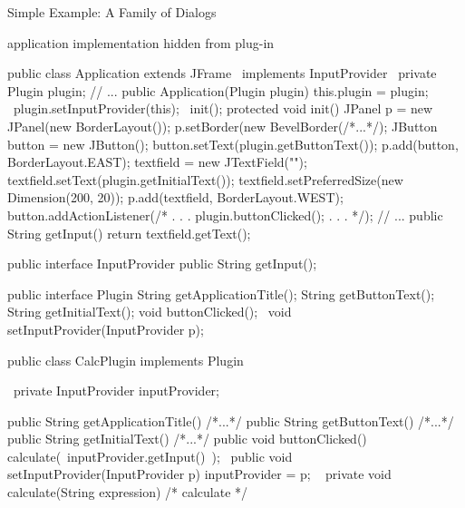 \begin{frame}[fragile]{Simple Example: A Family of Dialogs}
	\begin{fancycolumns}
		\begin{note}{}
			application implementation hidden from plug-in
		\end{note}
\begin{codetight}[basicstyle=\tiny]{}
public class Application extends JFrame ~implements InputProvider~ {
	private Plugin plugin;
	// ...
	public Application(Plugin plugin) {
		this.plugin = plugin;
		~plugin.setInputProvider(this);~
		init();
	}
	protected void init() {
		JPanel p = new JPanel(new BorderLayout());
		p.setBorder(new BevelBorder(/*...*/);
		JButton button = new JButton();
		button.setText(plugin.getButtonText());
		p.add(button, BorderLayout.EAST);
		textfield = new JTextField("");
		textfield.setText(plugin.getInitialText());
		textfield.setPreferredSize(new Dimension(200, 20));
		p.add(textfield, BorderLayout.WEST);		
		button.addActionListener(/* . . . plugin.buttonClicked(); . . . */);		
		// ...
	}
	public String getInput() {
		return textfield.getText();
	}
}
\end{codetight}
		\nextcolumn
{
\begin{codetight}[basicstyle=\tiny]{}
public interface InputProvider {
	public String getInput();
}
\end{codetight}
\begin{codetight}[basicstyle=\tiny]{}
public interface Plugin {
	String getApplicationTitle();
	String getButtonText();
	String getInitialText();
	void buttonClicked();
	~void setInputProvider(InputProvider p);~
}
\end{codetight}
\begin{codetight}[basicstyle=\tiny]{}
public class CalcPlugin implements Plugin {
	~private InputProvider inputProvider;~

	public String getApplicationTitle() { /*...*/ }
	public String getButtonText() { /*...*/ }
	public String getInitialText() { /*...*/ }
	public void buttonClicked() {
		calculate(~inputProvider.getInput()~);
	}
	~public void setInputProvider(InputProvider p) {
		inputProvider = p;
	}~
	private void calculate(String expression) {
		/* calculate */
	}
}
\end{codetight}
}
	\end{fancycolumns}
\end{frame}

